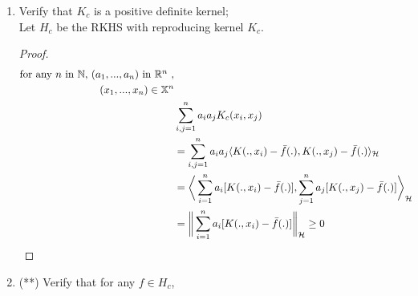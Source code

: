 \documentclass{article}
\begin{document}
\begin{enumerate}
    


    \item Verify that $K_c$ is a positive definite kernel; \\ 
          Let $H_c$ be the RKHS with reproducing kernel $K_c$. 

        \begin{proof}
        \begin{equation}
            \begin{aligned} 
                \mbox{for any $n$ in $\mathbb{N}$, $(a_1, ..., a_n)$ in $\mathbb{R}^n$ ,} \notag \\
                (x_1, ..., x_n) \in \mathbb{X}^n \\
                &\sum_{i,j=1}^{n} a_i a_j K_c(x_i, x_j)  \\
                &= \sum_{i,j=1}^{n} a_i a_j \langle K(.,x_i) - \bar{f}(.), K(.,x_j) - \bar{f}(.)\rangle_{\mathcal{H}} \\
                &= \bigg \langle \sum_{i=1}^{n} a_i [K(.,x_i) - \bar{f}(.)], 
                    \sum_{j=1}^{n} a_j [K(.,x_j) - \bar{f}(.)] \bigg \rangle_{\mathcal{H}} \\
                & = \bigg \| \sum_{i=1}^{n} a_i [K(.,x_i) - \bar{f}(.)] \bigg \|_{\mathcal{H}} \ge 0
            \end{aligned}
        \end{equation} 
        \end{proof}
    


    \item (**) Verify that for any $f \in H_c$, 
        

\end{enumerate}
\end{document}
